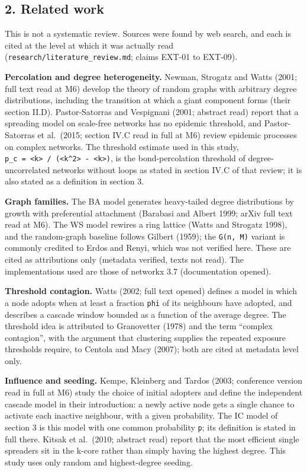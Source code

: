 \documentclass[
]{article}
\begin{document}
\subsection{2. Related work}\label{related-work}

This is not a systematic review. Sources were found by web search, and
each is cited at the level at which it was actually read
(\texttt{research/literature\_review.md}; claims EXT-01 to EXT-09).

\textbf{Percolation and degree heterogeneity.} Newman, Strogatz and
Watts (2001; full text read at M6) develop the theory of random graphs
with arbitrary degree distributions, including the transition at which a
giant component forms (their section II.D). Pastor-Satorras and
Vespignani (2001; abstract read) report that a spreading model on
scale-free networks has no epidemic threshold, and Pastor-Satorras et
al.~(2015; section IV.C read in full at M6) review epidemic processes on
complex networks. The threshold estimate used in this study,
\texttt{p\_c\ =\ \textless{}k\textgreater{}\ /\ (\textless{}k\^{}2\textgreater{}\ -\ \textless{}k\textgreater{})},
is the bond-percolation threshold of degree-uncorrelated networks
without loops as stated in section IV.C of that review; it is also
stated as a definition in section 3.

\textbf{Graph families.} The BA model generates heavy-tailed degree
distributions by growth with preferential attachment (Barabasi and
Albert 1999; arXiv full text read at M6). The WS model rewires a ring
lattice (Watts and Strogatz 1998), and the random-graph baseline follows
Gilbert (1959); the \texttt{G(n,\ M)} variant is commonly credited to
Erdos and Renyi, which was not verified here. These are cited as
attributions only (metadata verified, texts not read). The
implementations used are those of networkx 3.7 (documentation opened).

\textbf{Threshold contagion.} Watts (2002; full text opened) defines a
model in which a node adopts when at least a fraction \texttt{phi} of
its neighbours have adopted, and describes a cascade window bounded as a
function of the average degree. The threshold idea is attributed to
Granovetter (1978) and the term ``complex contagion'', with the argument
that clustering supplies the repeated exposure thresholds require, to
Centola and Macy (2007); both are cited at metadata level only.

\textbf{Influence and seeding.} Kempe, Kleinberg and Tardos (2003;
conference version read in full at M6) study the choice of initial
adopters and define the independent cascade model in their introduction:
a newly active node gets a single chance to activate each inactive
neighbour, with a given probability. The IC model of section 3 is this
model with one common probability \texttt{p}; its definition is stated
in full there. Kitsak et al.~(2010; abstract read) report that the most
efficient single spreaders sit in the k-core rather than simply having
the highest degree. This study uses only random and highest-degree
seeding.
\end{document}
